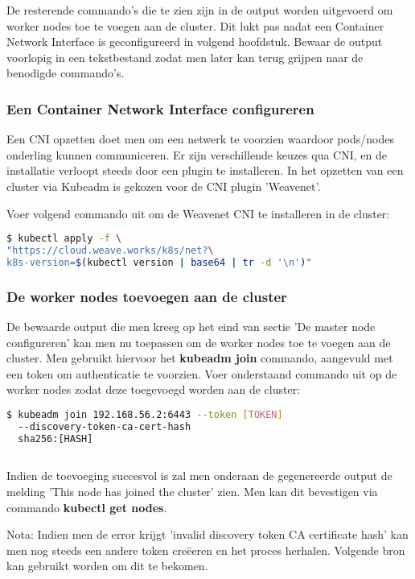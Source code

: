 De resterende commando's die te zien zijn in de output worden uitgevoerd om worker nodes toe te voegen aan de cluster. Dit lukt pas nadat een Container Network Interface is geconfigureerd in volgend hoofdstuk. Bewaar de output voorlopig in een tekstbestand zodat men later kan terug grijpen naar de benodigde commando's.

\subsubsection{Een Container Network Interface configureren}

Een CNI opzetten doet men om een netwerk te voorzien waardoor pods/nodes onderling kunnen communiceren. Er zijn verschillende keuzes qua CNI, en de installatie verloopt steeds door een plugin te installeren. In het opzetten van een cluster via Kubeadm is gekozen voor de CNI plugin 'Weavenet'. \autocite{Weaveworks2022}

Voer volgend commando uit om de Weavenet CNI te installeren in de cluster: 
\begin{lstlisting}[language=bash]
$ kubectl apply -f \
"https://cloud.weave.works/k8s/net?\
k8s-version=$(kubectl version | base64 | tr -d '\n')"
\end{lstlisting}

\subsubsection{De worker nodes toevoegen aan de cluster}

De bewaarde output die men kreeg op het eind van sectie 'De master node configureren' kan men nu toepassen om de worker nodes toe te voegen aan de cluster. 
Men gebruikt hiervoor het {\bf kubeadm join} commando, aangevuld met een token om authenticatie te voorzien. Voer onderstaand commando uit op de worker nodes zodat deze toegevoegd worden aan de cluster:
\begin{lstlisting}[language=bash]
$ kubeadm join 192.168.56.2:6443 --token [TOKEN] 
  --discovery-token-ca-cert-hash
  sha256:[HASH]
  
\end{lstlisting} 

Indien de toevoeging succesvol is zal men onderaan de gegenereerde output de melding 'This node has joined the cluster' zien. Men kan dit bevestigen via commando {\bf kubectl get nodes}. 

Nota: Indien men de error krijgt 'invalid discovery token CA certificate hash' kan men nog steeds een andere token creëeren en het proces herhalen. Volgende bron kan gebruikt worden om dit te bekomen. \autocite{Mukul2020} 


